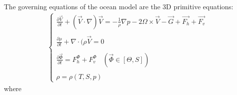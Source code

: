 \documentclass[oribibl]{llncs}
\begin{document}
The governing equations of the ocean model are the 3D primitive equations:
\begin{eqnarray}
\left \{
\begin{array}{l}  
\frac{\partial \vec{V}}{\partial t} + (\vec{V} \cdot  \nabla) \vec{V} = - \frac{1}{\rho} \nabla {p} -2\Omega \times \vec{V} - \vec{G} +\vec{F_h} +\vec{F_v}  \\   \\ 
\frac{\partial \rho}{\partial t} + \nabla \cdot (\rho \vec{V}  = 0  \\  \\ 
\frac{\partial \vec{\Phi}}{\partial t}= F_h^\Phi + F_v^\Phi \ \ \ \ (\vec{\Phi} \in [\Theta,S])  \\  \\ 
\rho = \rho(T,S,p) 
\end{array}
\right.
\end{eqnarray}
where
\end{document}
